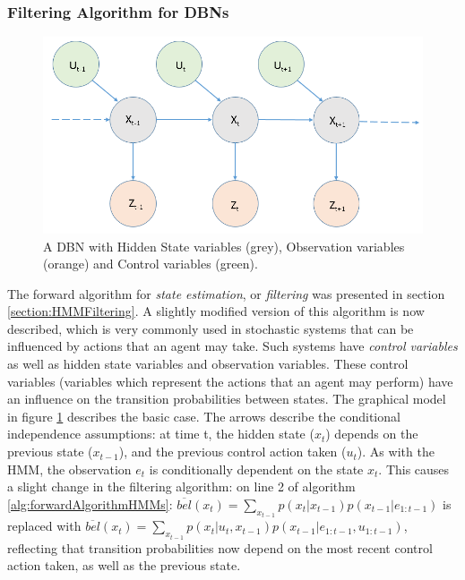 \subsubsection{Filtering Algorithm for DBNs}\label{subsubsec:filteringDBN}
\begin{figure}
    \centering
    \includegraphics[width = 0.65\linewidth]{Chapters/BackgroundKnowledgeAndRelatedWork/MultiAgentTargetDetectionBackground/Figs/HMMs/HMMWithControl.png}
    \caption{A DBN with Hidden State variables (grey), Observation variables (orange) and Control variables (green).}
    \label{fig:HMMWithControlVariablesExample}
\end{figure}
The forward algorithm for \textit{state estimation}, or \textit{filtering} was presented in section \ref{section:HMMFiltering}. A slightly modified version of this algorithm is now described, which is very commonly used in stochastic systems that can be influenced by actions that an agent may take. Such systems have \textit{control variables} as well as hidden state variables and observation variables. These control variables (variables which represent the actions that an agent may perform) have an influence on the transition probabilities between states. The graphical model in figure \ref{fig:HMMWithControlVariablesExample} describes the basic case. The arrows describe the conditional independence assumptions: at time t, the hidden state ($x_t$) depends on the previous state ($x_{t-1}$), and the previous control action taken ($u_t$). As with the HMM, the observation $e_t$ is conditionally dependent on the state $x_t$. This causes a slight change in the filtering algorithm: on line 2 of algorithm \ref{alg:forwardAlgorithmHMMs}: $\overline{bel}(x_t) = \sum_{x_{t-1}} p(x_t | x_{t-1}) p(x_{t-1} | e_{1:t-1}) $ is replaced with $\overline{bel}(x_t) = \sum_{x_{t-1}} p(x_t | u_t, x_{t-1}) p(x_{t-1} | e_{1:t-1}, u_{1:t-1}) $, reflecting that transition probabilities now depend on the most recent control action taken, as well as the previous state.


